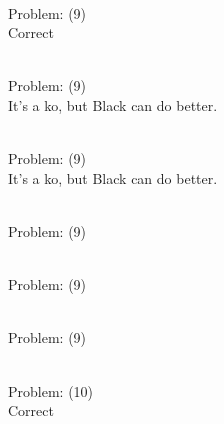 \documentclass[11pt]{article}
\begin{document}
\begin{minipage}[t]{0.5\textwidth}
  {\centering
  
\\
Problem: (9)\\
Correct\\
  }
\end{minipage}
\begin{minipage}[t]{0.5\textwidth}
  {\centering
  
\\
Problem: (9)\\
It's a ko, but Black can do better.\\
  }
\end{minipage}
\begin{minipage}[t]{0.5\textwidth}
  {\centering
  
\\
Problem: (9)\\
It's a ko, but Black can do better.\\
  }
\end{minipage}
\begin{minipage}[t]{0.5\textwidth}
  {\centering
  
\\
Problem: (9)\\
  }
\end{minipage}
\begin{minipage}[t]{0.5\textwidth}
  {\centering
  
\\
Problem: (9)\\
  }
\end{minipage}
\begin{minipage}[t]{0.5\textwidth}
  {\centering
  
\\
Problem: (9)\\
  }
\end{minipage}
\begin{minipage}[t]{0.5\textwidth}
  {\centering
  
\\
Problem: (10)\\
Correct\\
  }
\end{minipage}
\end{document}

